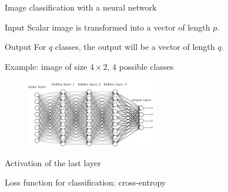 \documentclass[xcolor=pdftex,dvipsnames,table,mathserif]{beamer}
\begin{document}
\begin{frame}{Image classification with a neural network}

  \begin{block}{Input}
    Scalar image is transformed into a vector of length $p$.
  \end{block}

  \begin{block}{Output}
    For $q$ classes, the output will be a vector of length $q$.
  \end{block}

  \begin{block}{Example: image of size $4 \times 2$, $4$ possible classes}

  \end{block}
\begin{figure}
  \includegraphics[width=0.5\textwidth]{network}
\end{figure}

\end{frame}


\begin{frame}{Activation of the last layer}

\end{frame}

\begin{frame}{Loss function for classification: cross-entropy}

\end{frame}

\end{document}
